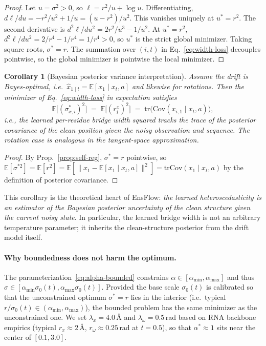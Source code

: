 \documentclass{article}
\newtheorem{corollary}{Corollary}
\theoremstyle{remark}
\theoremstyle{definition}
\newcommand{\E}{\mathbb{E}}
\newcommand{\Cov}{\mathrm{Cov}}
\newcommand{\tr}{\mathrm{tr}}
\begin{document}
\begin{proof}
Let $u=\sigma^2>0$, so $\ell=r^2/u+\log u$. Differentiating,
$d\ell/du = -r^2/u^2+1/u=(u-r^2)/u^2$. This vanishes uniquely at $u^{\ast}=r^2$.
The second derivative is
$d^2\ell/du^2=2r^2/u^3-1/u^2$. At $u^{\ast}=r^2$,
$d^2\ell/du^2=2/r^4-1/r^4=1/r^4>0$, so $u^{\ast}$ is the strict global
minimizer. Taking square roots, $\sigma^{\ast}=r$. The summation over $(i,t)$
in Eq.~\eqref{eq:width-loss} decouples pointwise, so the global minimizer is
pointwise the local minimizer.
\end{proof}

\begin{corollary}[Bayesian posterior variance interpretation]
\label{cor:posterior}
Assume the drift is Bayes-optimal, i.e.\ $\hat{x}_{1\mid t}=\E[x_1\mid
x_t,a]$ and likewise for rotations. Then the minimizer of
Eq.~\eqref{eq:width-loss} in expectation satisfies
\[
\E\big[(\sigma^{\ast}_{x,i})^2\big]\;=\;\E\big[(r^x_i)^2\big]
\;=\;\tr\!\big(\Cov(x_{i,1}\mid x_t,a)\big),
\]
i.e., the learned per-residue bridge width squared tracks the trace of the
posterior covariance of the clean position given the noisy observation and
sequence. The rotation case is analogous in the tangent-space approximation.
\end{corollary}

\begin{proof}
By Prop.~\ref{prop:self-reg}, $\sigma^{\ast}=r$ pointwise, so
$\E[\sigma^{\ast 2}]=\E[r^2]=\E[\|x_1-\E[x_1\mid x_t,a]\|^2]=
\tr\Cov(x_1\mid x_t,a)$ by the definition of posterior covariance.
\end{proof}

This corollary is the theoretical heart of EnsFlow: \emph{the learned
heteroscedasticity is an estimator of the Bayesian posterior uncertainty of
the clean structure given the current noisy state}. In particular, the
learned bridge width is not an arbitrary temperature parameter; it inherits
the clean-structure posterior from the drift model itself.

\paragraph{Why boundedness does not harm the optimum.}
The parameterization~\eqref{eq:alpha-bounded} constrains
$\alpha\in[\alpha_{\min},\alpha_{\max}]$ and thus
$\sigma\in[\alpha_{\min}\sigma_0(t),\alpha_{\max}\sigma_0(t)]$. Provided the
base scale $\sigma_0(t)$ is calibrated so that the unconstrained optimum
$\sigma^{\ast}=r$ lies in the interior (i.e.\ typical $r/\sigma_0(t)\in
(\alpha_{\min},\alpha_{\max})$), the bounded problem has the same minimizer as
the unconstrained one. We set $\lambda_x=4.0\,$\AA{} and
$\lambda_\omega=0.5\,$rad based on RNA backbone empirics (typical
$r_x\!\approx\!2\,$\AA, $r_\omega\!\approx\!0.25\,$rad at $t=0.5$), so that
$\alpha^{\ast}\approx 1$ sits near the center of $[0.1,3.0]$.
\end{document}
